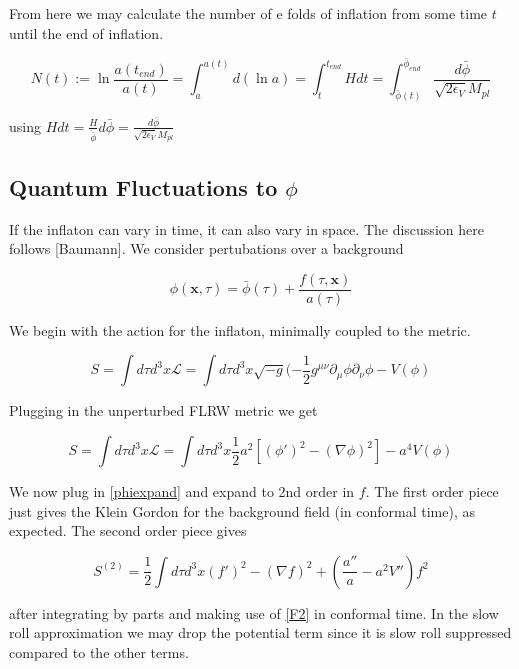 \documentclass[a4paper,11pt]{article}
\renewcommand{\v}[1]{\mathbf{#1}}
\newcommand{\Mp}{M_{pl}}
\newcommand{\half}{\frac{1}{2}}
\newcommand{\bphi}{\bar{\phi}}
\begin{document}
From here we may calculate the number of e folds of inflation from some time $t$ until the end of inflation. 

\begin{equation}
N(t) := \ln{\frac{a(t_{end})}{a(t)}} = \int_a^{a(t)} d(\ln{a}) = \int_t^{t_{end}} Hdt = \int_{\bphi(t)}^{\bphi_{end}} \frac{d\bphi}{\sqrt{2\epsilon_V}\Mp}
\label{efolds}
\end{equation}

using $Hdt=\frac{H}{\dot{\bphi}}d\bphi=\frac{d\bphi}{\sqrt{2\epsilon_V}\Mp}$

\subsection{Quantum Fluctuations to $\phi$}

If the inflaton can vary in time, it can also vary in space. The discussion here follows [Baumann]. We consider pertubations over a background

\begin{equation}
\phi(\v{x},\tau) = \bphi(\tau) + \frac{f(\tau, \v{x})}{a(\tau)}
\label{phiexpand}
\end{equation}

We begin with the action for the inflaton, minimally coupled to the metric.

\begin{equation}
S =\int d\tau d^3x \mathcal{L}  =  \int d\tau d^3x \sqrt{-g} (-\half g^{\mu \nu}\partial_\mu \phi\partial_\nu \phi - V(\phi)  
\end{equation}

Plugging in the unperturbed FLRW metric we get 


\begin{equation}
S = \int d\tau d^3x \mathcal{L}  = \int d\tau d^3x \half a^2 [(\phi ' )^2 -(\nabla \phi)^2]-a^4V(\phi)
\label{scalarfieldaction}
\end{equation}

We now plug in \ref{phiexpand} and expand to 2nd order in $f$. The first order piece just gives the Klein Gordon for the background field (in conformal time), as expected. The second order piece gives

\begin{equation}
S^{(2)} = \half \int d\tau d^3x (f')^2 - (\nabla f)^2 + (\frac{a''}{a}-a^2V'')f^2
\end{equation}

after integrating by parts and making use of \ref{F2} in conformal time. In the slow roll approximation we may drop the potential term since it is slow roll suppressed compared to the other terms.
\end{document}
